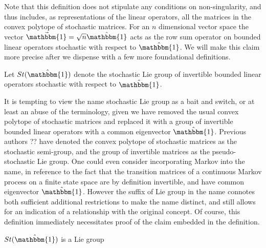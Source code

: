 Note that this definition does not stipulate any conditions on non-singularity,
and thus includes, as representations of the linear operators, all the matrices 
in the convex polytope of stochastic matrices. For an $n$ dimensional vector 
space the vector $\vec{\mathbbm{1}} = \sqrt{n} \hat{\mathbbm{1}}$ acts as the 
row sum operator on bounded linear operators stochastic with respect to $\hat{\mathbbm{1}}$. 
We will make this claim more precise after we dispense with a few more 
foundational definitions.

\begin{definition}
	Let $St(\hat{\mathbbm{1}})$ denote the stochastic Lie group of invertible 
	bounded linear operators stochastic with respect to $\hat{\mathbbm{1}}$.
\end{definition}

It is tempting to view the name stochastic Lie group as a bait and switch, or 
at least an abuse of the terminology, given we have removed the usual convex
polytope of stochastic matrices and replaced it with a group of invertible 
bounded linear operators with a common eigenvector $\hat{\mathbbm{1}}$. Previous 
authors ?? have denoted the convex polytope of stochastic matrices as the 
stochastic semi-group, and the group of invertible matrices as the 
pseudo-stochastic Lie group. One could even consider incorporating Markov into 
the name, in reference to the fact that the transition matrices of a continuous 
Markov process on a finite state space are by definition invertible, and have 
common eigenvector $\hat{\mathbbm{1}}$. However the suffix of Lie group in the 
name connotes both sufficient additional restrictions to make the name distinct, 
and still allows for an indication of a relationship with the original concept. 
Of course, this definition immediately necessitates proof of the claim embedded 
in the definition.

\begin{lemma}
	$St(\hat{\mathbbm{1}})$ is a Lie group
\end{lemma}

